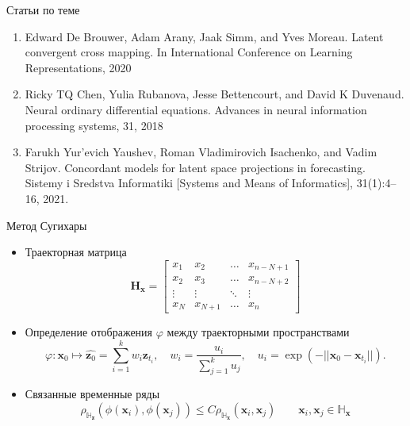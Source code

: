 \documentclass{beamer}
\newcommand{\bx}{\mathbf{x}}
\newcommand{\bz}{\mathbf{z}}
\newcommand{\dH}{\mathds{H}}
\begin{document}
	\begin{frame}{Статьи по теме}
		\begin{enumerate}
			\item Edward De Brouwer, Adam Arany, Jaak Simm, and Yves Moreau. Latent convergent
			cross mapping. In International Conference on Learning Representations, 2020
			\item Ricky TQ Chen, Yulia Rubanova, Jesse Bettencourt, and David K Duvenaud. Neural
			ordinary differential equations. Advances in neural information processing systems, 31,
			2018
			\item Farukh Yur’evich Yaushev, Roman Vladimirovich Isachenko, and Vadim Strijov.
			Concordant models for latent space projections in forecasting. Sistemy i Sredstva
			Informatiki [Systems and Means of Informatics], 31(1):4–16, 2021.
		\end{enumerate}
	\end{frame}

	\begin{frame}{Метод Сугихары}
		\begin{itemize}
			\item[\textbullet] Траекторная матрица
			\[ \textbf{H}_{\bx} = \begin{bmatrix}
				x_1 & x_2 & \ldots & x_{n-N+1} \\
				x_2 & x_3 & \ldots & x_{n-N+2} \\
				\vdots & \vdots & \ddots & \vdots \\
				x_{N} & x_{N+1} & \ldots & x_n
			\end{bmatrix}\]
		
			\item[\textbullet] Определение отображения $\varphi$ между траекторными пространствами
			\[ \varphi: \bx_0 \mapsto \widehat{\bz_0} = \sum\limits_{i=1}^k w_i \bz_{t_i}, \quad 
			w_i = \dfrac{u_i}{\sum\limits_{j=1}^k u_j}, \quad
			u_i = \exp(-||\bx_0 - \bx_{t_i}||). \]
			
			\item[\textbullet] Связанные временные ряды
			\[ \rho_{\dH_{\bz}}(\phi(\bx_i), \phi(\bx_j)) \leq C \rho_{\dH_{\bx}}(\bx_i, \bx_j) \qquad \bx_i, \bx_j \in \dH_{\bx} \]
		\end{itemize}
	\end{frame}
\end{document}
